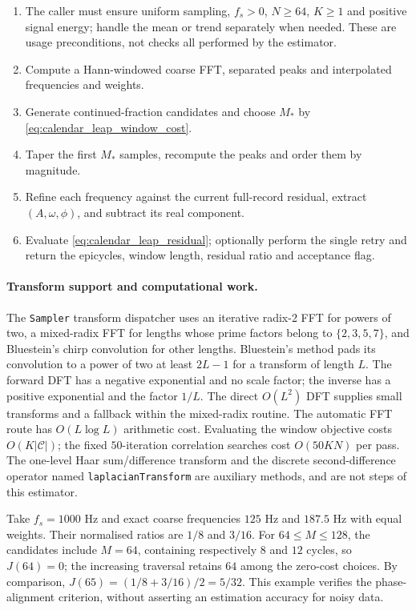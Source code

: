 \begin{enumerate}[label=(\arabic*)]
    \item The caller must ensure uniform sampling, \(f_s>0\), \(N\ge64\), \(K\ge1\) and positive signal energy; handle the mean or trend separately when needed. These are usage preconditions, not checks all performed by the estimator.
    \item Compute a Hann-windowed coarse FFT, separated peaks and interpolated frequencies and weights.
    \item Generate continued-fraction candidates and choose \(M_*\) by \cref{eq:calendar_leap_window_cost}.
    \item Taper the first \(M_*\) samples, recompute the peaks and order them by magnitude.
    \item Refine each frequency against the current full-record residual, extract \((A,\omega,\phi)\), and subtract its real component.
    \item Evaluate \cref{eq:calendar_leap_residual}; optionally perform the single retry and return the epicycles, window length, residual ratio and acceptance flag.
\end{enumerate}

\paragraph{Transform support and computational work.}
The \texttt{Sampler} transform dispatcher uses an iterative radix-2 FFT for powers of two, a mixed-radix FFT for lengths whose prime factors belong to \(\{2,3,5,7\}\), and Bluestein's chirp convolution for other lengths. Bluestein's method pads its convolution to a power of two at least \(2L-1\) for a transform of length \(L\). The forward DFT has a negative exponential and no scale factor; the inverse has a positive exponential and the factor \(1/L\). The direct \(O(L^2)\) DFT supplies small transforms and a fallback within the mixed-radix routine. The automatic FFT route has \(O(L\log L)\) arithmetic cost. Evaluating the window objective costs \(O(K|\mathcal C|)\); the fixed \(50\)-iteration correlation searches cost \(O(50KN)\) per pass. The one-level Haar sum/difference transform and the discrete second-difference operator named \texttt{laplacianTransform} are auxiliary methods, and are not steps of this estimator.

\begin{example}\label{ex:calendar_leap_window}
Take \(f_s=1000\) Hz and exact coarse frequencies \(125\) Hz and \(187.5\) Hz with equal weights. Their normalised ratios are \(1/8\) and \(3/16\). For \(64\le M\le128\), the candidates include \(M=64\), containing respectively \(8\) and \(12\) cycles, so \(J(64)=0\); the increasing traversal retains \(64\) among the zero-cost choices. By comparison, \(J(65)=(1/8+3/16)/2=5/32\). This example verifies the phase-alignment criterion, without asserting an estimation accuracy for noisy data.
\end{example}

